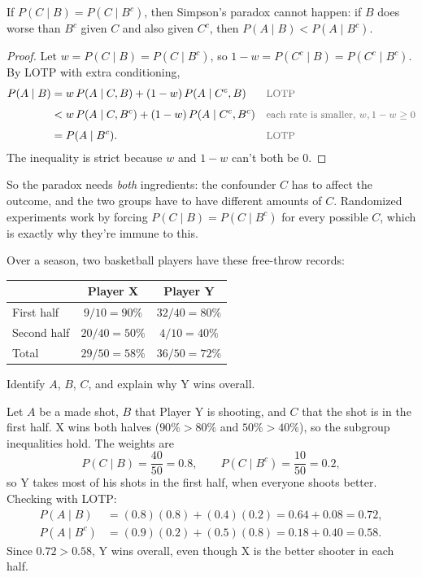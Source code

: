 \begin{proposition}\label{prop:noparadox}
If $P(C \mid B) = P(C \mid B^c)$, then Simpson's paradox cannot happen: if $B$ does worse than $B^c$ given $C$ and also given $C^c$, then $P(A \mid B) < P(A \mid B^c)$.
\end{proposition}
\begin{proof}
Let $w = P(C \mid B) = P(C \mid B^c)$, so $1 - w = P(C^c \mid B) = P(C^c \mid B^c)$. By LOTP with extra conditioning,
\begin{align*}
P(A \mid B)
  &= w\,P(A \mid C, B) + (1 - w)\,P(A \mid C^c, B)
  && \by{LOTP} \\[0.4em]
  &< w\,P(A \mid C, B^c) + (1 - w)\,P(A \mid C^c, B^c)
  && \by{each rate is smaller, $w, 1-w \ge 0$} \\[0.4em]
  &= P(A \mid B^c).
  && \by{LOTP}
\end{align*}
The inequality is strict because $w$ and $1 - w$ can't both be $0$.
\end{proof}

So the paradox needs \emph{both} ingredients: the confounder $C$ has to affect the outcome, and the two groups have to have different amounts of $C$. Randomized experiments work by forcing $P(C \mid B) = P(C \mid B^c)$ for every possible $C$, which is exactly why they're immune to this.

\begin{example}\label{ex:freethrows}
Over a season, two basketball players have these free-throw records:
\begin{center}
\begin{tabular}{@{}lcc@{}}
\toprule
 & \textbf{Player X} & \textbf{Player Y} \\
\midrule
First half  & $9/10 = 90\%$  & $32/40 = 80\%$ \\
Second half & $20/40 = 50\%$ & $4/10 = 40\%$ \\
\midrule
Total       & $29/50 = 58\%$ & $36/50 = 72\%$ \\
\bottomrule
\end{tabular}
\end{center}
Identify $A$, $B$, $C$, and explain why Y wins overall.
\end{example}
\begin{solution}
Let $A$ be a made shot, $B$ that Player Y is shooting, and $C$ that the shot is in the first half. X wins both halves ($90\% > 80\%$ and $50\% > 40\%$), so the subgroup inequalities hold. The weights are
\[
P(C \mid B) = \frac{40}{50} = 0.8,
\qquad
P(C \mid B^c) = \frac{10}{50} = 0.2,
\]
so Y takes most of his shots in the first half, when everyone shoots better. Checking with LOTP:
\begin{align*}
P(A \mid B)   &= (0.8)(0.8) + (0.4)(0.2) = 0.64 + 0.08 = 0.72, \\[0.3em]
P(A \mid B^c) &= (0.9)(0.2) + (0.5)(0.8) = 0.18 + 0.40 = 0.58.
\end{align*}
Since $0.72 > 0.58$, Y wins overall, even though X is the better shooter in each half.
\end{solution}

